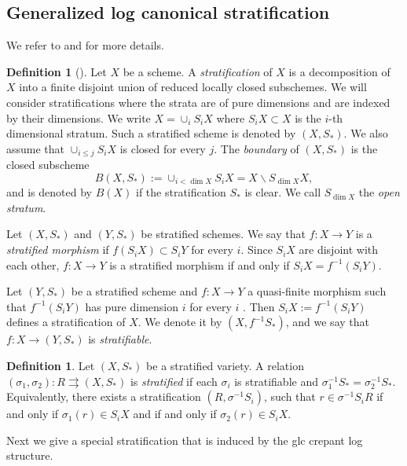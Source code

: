 \documentclass[11pt]{amsart}
\numberwithin{equation}{section}
\theoremstyle{definition}
\newtheorem{defn}[thm]{Definition}
\theoremstyle{definition}
\theoremstyle{definition}
\begin{document}
\subsection{Generalized log canonical stratification}

We refer to \cite[Section 5, Section 9]{Kol13} and \cite[Section 4]{LX22b} for more details. 



\begin{defn}[{\cite[Definition 9.15]{Kol13}}] 
Let $X$ be a scheme. A {\it stratification} of $X$ is a decomposition of $X$ into a finite disjoint union of reduced locally closed subschemes. We will consider stratifications where the strata are of pure dimensions
and are indexed by their dimensions. We write $X=\cup_{i}S_iX$ where $S_iX\subset X$ is the $i$-th
dimensional stratum. Such a stratified scheme is denoted by $(X,S_*)$. We also
assume that $\cup_{i\le j}S_iX$ is closed for every $j$. The {\it boundary} of $(X,S_*)$ is the closed subscheme
$$
B(X,S_*):=\cup_{i<\dim X}S_iX=X\backslash S_{\dim X}X,
$$
and is denoted by $B(X)$ if the stratification $S_*$ is clear. We call $S_{\dim X}$ the {\it open stratum}.


Let $(X, S_*)$ and $(Y, S_*)$ be stratified schemes. We say that $f:X\to Y$ is a {\it stratified morphism} if $f(S_iX)\subset S_iY$ for every $i$. Since $S_iX$ are disjoint with each other, $f: X\to Y$ is a stratified morphism if and only if $S_iX=f^{-1}(S_iY)$.


Let $(Y, S_*)$ be a stratified scheme and $f:X\to Y$ a quasi-finite morphism such that $f^{-1} (S_iY)$ has pure dimension $i$ for every $i$ . Then $S_iX:=f^{-1}(S_iY)$ defines a stratification of $X$. We denote it by $(X,f^{-1}S_*)$, and we say that $f:X\to(Y,S_*)$ is \emph{stratifiable}.
\end{defn}

\begin{defn}
Let $(X, S_*)$ be a stratified variety. A relation $(\sigma_1,\sigma_2): R\rightrightarrows (X,S_*)$ is {\it stratified} if each $\sigma_i$ is stratifiable and $\sigma_1^{-1}S_*=\sigma_2^{-1}S_*$. Equivalently,
there exists a stratification $(R,\sigma^{-1}S_i)$, such that $r\in\sigma^{-1}S_iR$ if and only if $\sigma_1(r)\in S_iX$ and if and only if $\sigma_2(r)\in S_iX$.
\end{defn}

Next we give a special stratification that is induced by the glc crepant log structure. 
\end{document}
